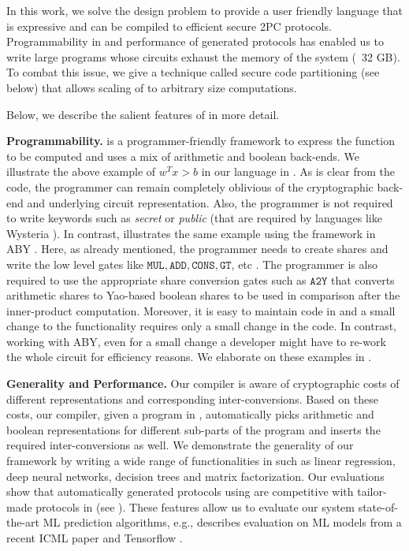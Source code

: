 In this work, we solve the design problem to provide a user friendly language that is expressive and can be compiled to efficient secure 2PC protocols.
Programmability in \tool and performance of generated protocols has enabled us to write large programs whose circuits  exhaust the memory of the system (~32 GB). To combat this issue, we give a technique called secure code partitioning (see below) that allows scaling of \tool to arbitrary size computations.

Below, we describe the salient features of \tool in more detail.


\textbf{Programmability.} \tool is a programmer-friendly framework to
express the function to be computed and uses a mix of arithmetic and
boolean \mpc back-ends. We illustrate the above example of $w^Tx
>b$ in our language in . 
As is clear from the code, the programmer can remain completely oblivious of the cryptographic back-end and underlying circuit representation. 
Also,  the programmer is not required to write keywords such as {\em secret}
or {\em public} (that are required by languages like Wysteria \cite{wysteria}). 
 In contrast,  illustrates
the same example using the framework in ABY \cite{aby}. Here, as
already mentioned, the programmer needs to create shares and write the low level gates
like $\mathtt{MUL, ADD, CONS, GT}$, etc . The programmer is also required
to use the appropriate share conversion gates such as $\mathtt{A2Y}$ that
converts arithmetic shares to Yao-based boolean shares to be used in comparison after the inner-product computation.
Moreover, it is easy to
maintain code in \tool and a small change to the functionality requires
only a small change in the code. In contrast, working with ABY, even
for a small change a developer might have to re-work the whole circuit
for efficiency reasons. We elaborate on these examples  in
.

\textbf{Generality and Performance.} Our compiler is aware of cryptographic costs of different representations and corresponding inter-conversions.  Based on these costs, our compiler, given a program in \tool, automatically picks arithmetic and boolean representations for different sub-parts of the program and inserts the required inter-conversions as well. 
We demonstrate the generality of our framework by writing a wide range of functionalities in \tool such as linear regression, deep neural networks, decision trees and matrix factorization.
Our evaluations show that automatically generated protocols using \tool are competitive with tailor-made protocols in \cite{shafindss,wu,barni,minionn,secureml,valeriaMatrix} (see ). These features allow us to evaluate our system state-of-the-art ML prediction algorithms, e.g.,  describes evaluation on ML models from a recent ICML paper \cite{bonsai} and Tensorflow \cite{tensorflow}.

